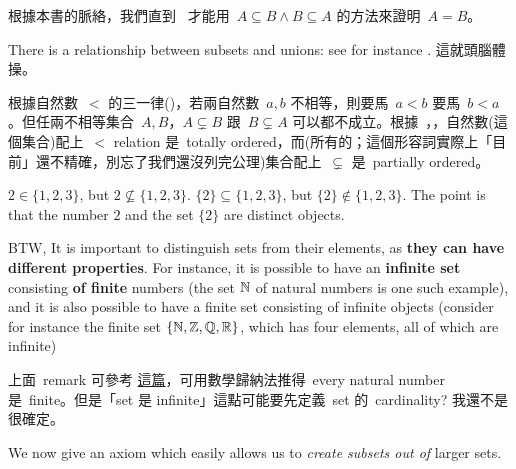 \begin{note}
根據本書的脈絡，我們直到\  才能用\ \(A \subseteq B \land B \subseteq A\) 的方法來證明\ \(A = B\)。
\end{note}

\begin{remark} \label{remark 3.1.19}
There is a relationship between subsets and unions: see for instance . 這就頭腦體操。
\end{remark}

\begin{remark}  \label{remark 3.1.20}
根據自然數\ \(<\) 的三一律()，若兩自然數\ \(a, b\) 不相等，則要馬\ \(a < b\) 要馬\ \(b < a\)。但任兩不相等集合\ \(A, B\)，\(A \subsetneq B\) 跟\ \(B \subsetneq A\) 可以都不成立。根據\ ，，自然數(這個集合)配上\ \(<\) relation 是\ totally ordered，而(所有的；這個形容詞實際上「目前」還不精確，別忘了我們還沒列完公理)集合配上\ \(\subsetneq\) 是\ partially ordered。
\end{remark}

\begin{remark}  \label{remark 3.1.21}
\(2 \in \{1, 2, 3\}\), but \(2 \not \subseteq \{1, 2, 3\}\). \(\{2\} \subseteq \{1, 2, 3\}\), but \(\{2\} \notin \{1, 2, 3\}\). The point is that the number \(2\) and the set \(\{2\}\) are distinct objects.

BTW, It is important to distinguish sets from their elements, as \textbf{they can have different properties}. For instance, it is possible to have an \textbf{infinite set} consisting \textbf{of finite} numbers (the set \(\mathbb{N}\) of natural numbers is one such example), and it is also possible to have a finite set consisting of infinite objects (consider for instance the finite set \(\{ \mathbb{N}, \mathbb{Z} , \mathbb{Q} , \mathbb{R} \} \), which has four elements, all of which are infinite)
\end{remark}

\begin{note}
上面\ remark 可參考 \href{https://math.stackexchange.com/questions/851599/why-set-of-natural-numbers-is-infinite-while-each-natural-number-is-finite}{這篇}，可用數學歸納法推得\ every natural number 是\ finite。但是「set 是 infinite」這點可能要先定義\ set 的\ cardinality? 我還不是很確定。
\end{note}

\begin{note}
We now give an axiom which easily allows us to \emph{create subsets out of} larger sets.
\end{note}

